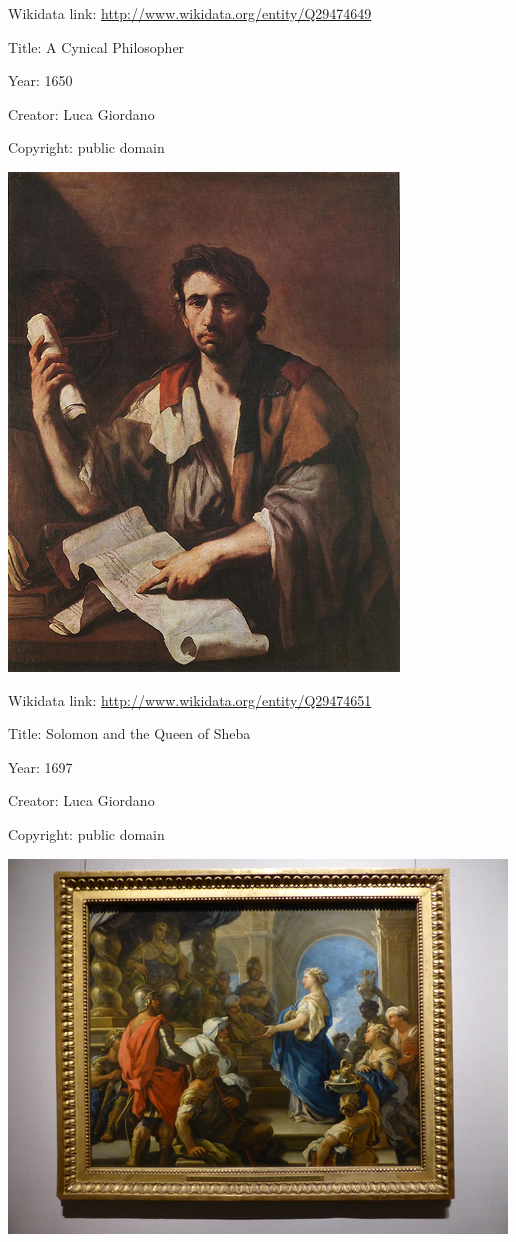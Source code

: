 \documentclass[
  letterpaper,
]{book}
\begin{document}
Wikidata link: \url{http://www.wikidata.org/entity/Q29474649}

Title: A Cynical Philosopher

Year: 1650

Creator: Luca Giordano

Copyright: public domain

\includegraphics{./paintings_files/figure-pdf/cell-2-output-4.png}

Wikidata link: \url{http://www.wikidata.org/entity/Q29474651}

Title: Solomon and the Queen of Sheba

Year: 1697

Creator: Luca Giordano

Copyright: public domain

\includegraphics{./paintings_files/figure-pdf/cell-2-output-6.png}
\end{document}
